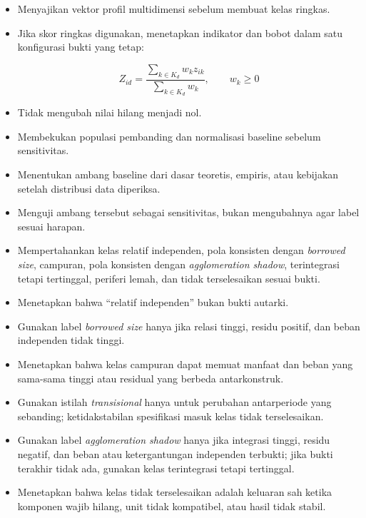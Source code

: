 \documentclass[
  indonesian,
  11pt,
]{article}
\begin{document}
\begin{itemize}
\item[$\square$]
  Menyajikan vektor profil multidimensi sebelum membuat kelas ringkas.
\item[$\square$]
  Jika skor ringkas digunakan, menetapkan indikator dan bobot dalam satu
  konfigurasi bukti yang tetap:

  \[
  Z_{id}=\frac{\sum_{k \in K_d} w_k z_{ik}}{\sum_{k \in K_d} w_k}, \qquad w_k \geq 0
  \]
\item[$\square$]
  Tidak mengubah nilai hilang menjadi nol.
\item[$\square$]
  Membekukan populasi pembanding dan normalisasi baseline sebelum
  sensitivitas.
\item[$\square$]
  Menentukan ambang baseline dari dasar teoretis, empiris, atau
  kebijakan setelah distribusi data diperiksa.
\item[$\square$]
  Menguji ambang tersebut sebagai sensitivitas, bukan mengubahnya agar
  label sesuai harapan.
\item[$\square$]
  Mempertahankan kelas relatif independen, pola konsisten dengan
  \emph{borrowed size}, campuran, pola konsisten dengan
  \emph{agglomeration shadow}, terintegrasi tetapi tertinggal, periferi
  lemah, dan tidak terselesaikan sesuai bukti.
\item[$\square$]
  Menetapkan bahwa ``relatif independen'' bukan bukti autarki.
\item[$\square$]
  Gunakan label \emph{borrowed size} hanya jika relasi tinggi, residu
  positif, dan beban independen tidak tinggi.
\item[$\square$]
  Menetapkan bahwa kelas campuran dapat memuat manfaat dan beban yang
  sama-sama tinggi atau residual yang berbeda antarkonstruk.
\item[$\square$]
  Gunakan istilah \emph{transisional} hanya untuk perubahan antarperiode
  yang sebanding; ketidakstabilan spesifikasi masuk kelas tidak
  terselesaikan.
\item[$\square$]
  Gunakan label \emph{agglomeration shadow} hanya jika integrasi tinggi,
  residu negatif, dan beban atau ketergantungan independen terbukti;
  jika bukti terakhir tidak ada, gunakan kelas terintegrasi tetapi
  tertinggal.
\item[$\square$]
  Menetapkan bahwa kelas tidak terselesaikan adalah keluaran sah ketika
  komponen wajib hilang, unit tidak kompatibel, atau hasil tidak stabil.
\end{itemize}
\end{document}
